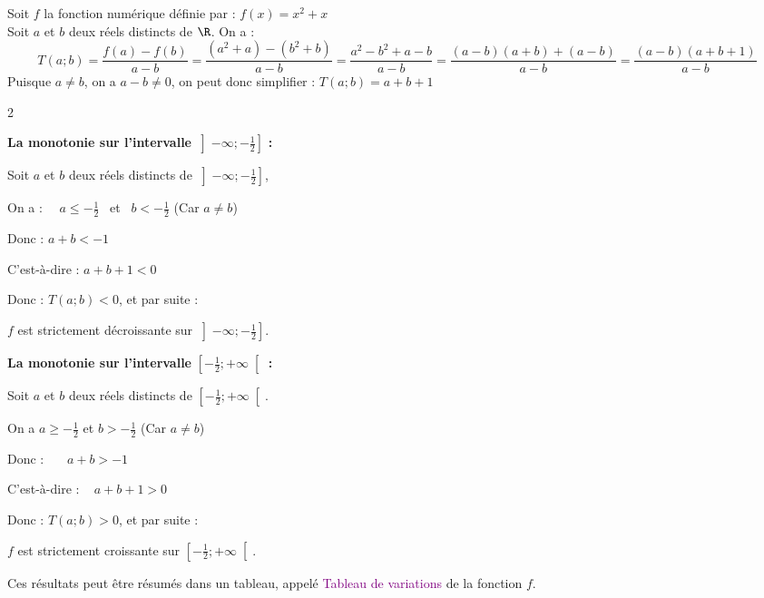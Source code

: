 \begin{Exemple}[][10 min]
Soit $f$ la fonction numérique définie par : $f(x) = x^2 + x$
\vspace{0.1cm} \\
Soit $a$ et $b$ deux réels distincts de $\R$. On a  :
\[ T(a ; b) = \frac{f(a) - f(b)}{a - b}  = \frac{(a^2 + a) - (b^2 + b)}{a - b} = \frac{a^2 - b^2 + a - b}{a - b} 
 = \frac{(a - b)(a + b) + (a - b)}{a - b} 
 = \frac{(a - b)(a + b + 1)}{a - b} \]
Puisque $a \neq b$, on a $a - b \neq 0$, on peut donc simplifier :
 $T(a ; b) = a + b + 1$ 

\medskip

\begin{multicols}{2}

\textbf{La monotonie sur l'intervalle } $\left]-\infty ; -\frac{1}{2}\right]$ \textbf{:}

Soit $a$ et $b$ deux réels distincts de $\left]-\infty ; -\frac{1}{2}\right]$,

On a :~~ $a \leq -\frac{1}{2}$ ~et~ $b < -\frac{1}{2}$  (Car $a \neq b$) 

Donc : \qquad  $a + b < -1$ 

C'est-à-dire :  $a + b + 1 < 0$ 

Donc : $T(a ; b) < 0$, et par suite : 

$f$ est strictement décroissante sur $\left]-\infty ; -\frac{1}{2}\right]$.

\columnbreak

\textbf{La monotonie sur l'intervalle } $\left[-\frac{1}{2} ; +\infty\right[$ \textbf{:}

Soit $a$ et $b$ deux réels distincts de $\left[-\frac{1}{2} ; +\infty\right[$. 

On a $a \geq -\frac{1}{2}$ et $b > -\frac{1}{2}$ \quad (Car $a \neq b$)

Donc :~~~ $a + b > -1$ 

C'est-à-dire : ~ $a + b + 1 > 0$ 

Donc : $T(a ; b) > 0$, et par suite : 

$f$ est strictement croissante sur $\left[-\frac{1}{2} ; +\infty\right[$. 
    
\end{multicols}

Ces résultats peut être résumés dans un tableau, appelé \textcolor{purple}{Tableau de variations} de la fonction $f$.
\vspace{0.2cm} 
\begin{center}
\end{center}

\end{Exemple}

